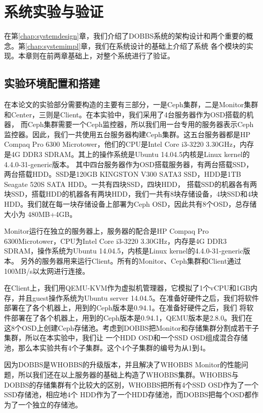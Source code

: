 
\chapter{系统实验与验证}
\label{chap:experiment}
在第\ref{chap:systemdesign}章，我们介绍了DOBBS系统的架构设计和两个重要的概念。第\ref{chap:systemimpl}章，我们在系统设计的基础上介绍了系统
各个模块的实现。本章则在前两章基础上，对整个系统进行了验证。

\section{实验环境配置和搭建}
在本论文的实验部分需要构造的主要有三部分，一是Ceph集群，二是Monitor集群和Center，三则是Client。在本实验中，我们采用了4台服务器作为OSD搭载的机器，
而Ceph集群需要一个Ceph监控器，所以我们用一台专用的服务器表示Ceph监控器。因此，我们一共使用五台服务器构建Ceph集群。这五台服务器都是HP Compaq Pro 6300
Microtower，他们的CPU是Intel Core i3-3220 3.30GHz，内存是4G DDR3 SDRAM。其上的操作系统是Ubuntu 14.04.5内核是Linux kernel的4.4.0-31-generic版本。
其中四台服务器作为OSD搭载服务器，有两台搭载SSD，两台搭载HDD。SSD是120GB KINGSTON V300 SATA3 SSD，HDD是1TB Seagate 520S SATA HDD。一共有四块SSD，四块HDD，
搭载SSD的机器各有两块SSD，搭载HDD的机器各有两块HDD，我们一共有8块存储设备，4块SSD和4块HDD。我们就在每一块存储设备上部署为Ceph OSD，因此共有8个OSD，总存储大小为
480MB+4GB。

Monitor运行在独立的服务器上，服务器的配合是HP Compaq Pro 6300Microtower，CPU为Intel Core i3-3220 3.30GHz，内存是4G DDR3 SDRAM，操作系统为Ubuntu 14.04.5，内核是Linux kernel的4.4.0-31-generic版本。
另外的服务器用来运行Client。所有的Monitor、Ceph集群和Client通过100MB/s以太网进行连接。

在Client上，我们用QEMU-KVM作为虚拟机管理器，它模拟了1个vCPU和1GB内存，并且guest操作系统为Ubuntu server 14.04.5。在准备好硬件之后，我们将软件部署在了各个机器上，用到的Ceph版本是0.94.1。在准备好硬件之后，我们
将软件部署在了各个机器上，用到的Ceph版本是0.94.1，QEMU版本是2.8.0。我们在这8个OSD上创建Ceph存储池。考虑到DOBBS把Monitor和存储集群分割成若干子集群，所以在本实验中，我们让
一个HDD OSD和一个SSD OSD组成混合存储池，那么本实验共有4个子集群。这个4个子集群的编号为从1到4。

因为DOBBS是WHOBBS的升级版本，并且解决了WHOBBS Monitor的性能问题，所以我们还在以上服务器的基础上构造了WHOBBS集群。WHOBBS与DOBBS的存储集群有个比较大的区别，WHOBBS把所有4个SSD OSD作为了一个SSD存储池，相应地4个
HDD作为了一个HDD存储池，而DOBBS把每个OSD都作为了一个独立的存储池。

